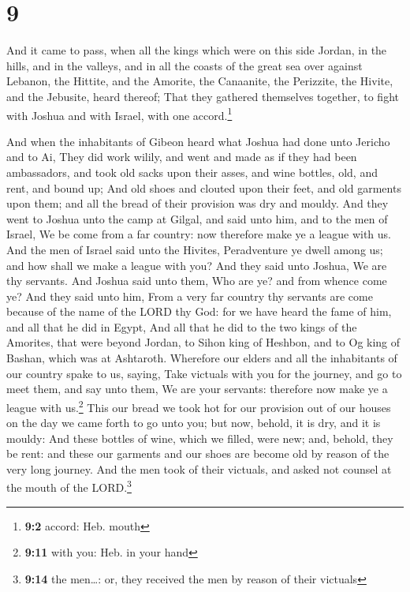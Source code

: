 \hypertarget{section-8}{%
\section{9}\label{section-8}}

 And it came to pass, when all the kings which were on
this side Jordan, in the hills, and in the valleys, and in all the
coasts of the great sea over against Lebanon, the Hittite, and the
Amorite, the Canaanite, the Perizzite, the Hivite, and the Jebusite,
heard thereof;  That they gathered themselves together, to
fight with Joshua and with Israel, with one accord.\footnote{\textbf{9:2}
  accord: Heb. mouth}

 And when the inhabitants of Gibeon heard what Joshua had
done unto Jericho and to Ai,  They did work wilily, and
went and made as if they had been ambassadors, and took old sacks upon
their asses, and wine bottles, old, and rent, and bound up;
 And old shoes and clouted upon their feet, and old
garments upon them; and all the bread of their provision was dry and
mouldy.  And they went to Joshua unto the camp at Gilgal,
and said unto him, and to the men of Israel, We be come from a far
country: now therefore make ye a league with us.  And the
men of Israel said unto the Hivites, Peradventure ye dwell among us; and
how shall we make a league with you?  And they said unto
Joshua, We are thy servants. And Joshua said unto them, Who are ye? and
from whence come ye?  And they said unto him, From a very
far country thy servants are come because of the name of the LORD thy
God: for we have heard the fame of him, and all that he did in Egypt,
 And all that he did to the two kings of the Amorites,
that were beyond Jordan, to Sihon king of Heshbon, and to Og king of
Bashan, which was at Ashtaroth.  Wherefore our elders and
all the inhabitants of our country spake to us, saying, Take victuals
with you for the journey, and go to meet them, and say unto them, We are
your servants: therefore now make ye a league with us.\footnote{\textbf{9:11}
  with you: Heb. in your hand}  This our bread we took
hot for our provision out of our houses on the day we came forth to go
unto you; but now, behold, it is dry, and it is mouldy: 
And these bottles of wine, which we filled, were new; and, behold, they
be rent: and these our garments and our shoes are become old by reason
of the very long journey.  And the men took of their
victuals, and asked not counsel at the mouth of the LORD.\footnote{\textbf{9:14}
  the men\ldots: or, they received the men by reason of their victuals}

